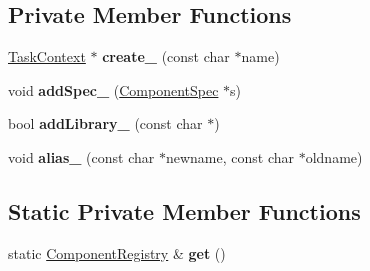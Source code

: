 \subsection*{Private Member Functions}
\begin{DoxyCompactItemize}
\item 
\hypertarget{classcoco_1_1_component_registry_a948e4e55ecc8816bb00adef0e18732b3}{\hyperlink{classcoco_1_1_task_context}{Task\-Context} $\ast$ {\bfseries create\-\_\-} (const char $\ast$name)}\label{classcoco_1_1_component_registry_a948e4e55ecc8816bb00adef0e18732b3}

\item 
\hypertarget{classcoco_1_1_component_registry_a3a0a94247eecb4a2ebdac0ec559745ff}{void {\bfseries add\-Spec\-\_\-} (\hyperlink{classcoco_1_1_component_spec}{Component\-Spec} $\ast$s)}\label{classcoco_1_1_component_registry_a3a0a94247eecb4a2ebdac0ec559745ff}

\item 
\hypertarget{classcoco_1_1_component_registry_adc252eec7576f3bda778cecb3662d2f5}{bool {\bfseries add\-Library\-\_\-} (const char $\ast$)}\label{classcoco_1_1_component_registry_adc252eec7576f3bda778cecb3662d2f5}

\item 
\hypertarget{classcoco_1_1_component_registry_a31855c1fe9a7697b8225e5108c92891e}{void {\bfseries alias\-\_\-} (const char $\ast$newname, const char $\ast$oldname)}\label{classcoco_1_1_component_registry_a31855c1fe9a7697b8225e5108c92891e}

\end{DoxyCompactItemize}
\subsection*{Static Private Member Functions}
\begin{DoxyCompactItemize}
\item 
\hypertarget{classcoco_1_1_component_registry_a1ada72627a6e3daf61115a20fdfc00f5}{static \hyperlink{classcoco_1_1_component_registry}{Component\-Registry} \& {\bfseries get} ()}\label{classcoco_1_1_component_registry_a1ada72627a6e3daf61115a20fdfc00f5}

\end{DoxyCompactItemize}
